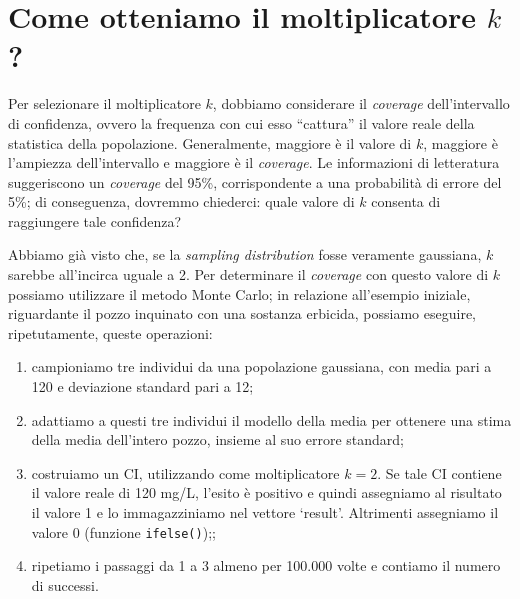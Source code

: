 \documentclass[
  12pt,
]{book}
\providecommand{\tightlist}{%
  \setlength{\itemsep}{0pt}\setlength{\parskip}{0pt}}
\begin{document}
\hypertarget{come-otteniamo-il-moltiplicatore-k}{%
\section{\texorpdfstring{Come otteniamo il moltiplicatore \(k\)?}{Come otteniamo il moltiplicatore k?}}\label{come-otteniamo-il-moltiplicatore-k}}

Per selezionare il moltiplicatore \(k\), dobbiamo considerare il \emph{coverage} dell'intervallo di confidenza, ovvero la frequenza con cui esso ``cattura'' il valore reale della statistica della popolazione. Generalmente, maggiore è il valore di \(k\), maggiore è l'ampiezza dell'intervallo e maggiore è il \emph{coverage}. Le informazioni di letteratura suggeriscono un \emph{coverage} del 95\%, corrispondente a una probabilità di errore del 5\%; di conseguenza, dovremmo chiederci: quale valore di \(k\) consenta di raggiungere tale confidenza?

Abbiamo già visto che, se la \emph{sampling distribution} fosse veramente gaussiana, \(k\) sarebbe all'incirca uguale a 2. Per determinare il \emph{coverage} con questo valore di \(k\) possiamo utilizzare il metodo Monte Carlo; in relazione all'esempio iniziale, riguardante il pozzo inquinato con una sostanza erbicida, possiamo eseguire, ripetutamente, queste operazioni:

\begin{enumerate}
\def\labelenumi{\arabic{enumi}.}
\tightlist
\item
  campioniamo tre individui da una popolazione gaussiana, con media pari a 120 e deviazione standard pari a 12;
\item
  adattiamo a questi tre individui il modello della media per ottenere una stima della media dell'intero pozzo, insieme al suo errore standard;
\item
  costruiamo un CI, utilizzando come moltiplicatore \(k = 2\). Se tale CI contiene il valore reale di 120 mg/L, l'esito è positivo e quindi assegniamo al risultato il valore 1 e lo immagazziniamo nel vettore `result'. Altrimenti assegniamo il valore 0 (funzione \texttt{ifelse()});;
\item
  ripetiamo i passaggi da 1 a 3 almeno per 100.000 volte e contiamo il numero di successi.
\end{enumerate}
\end{document}
